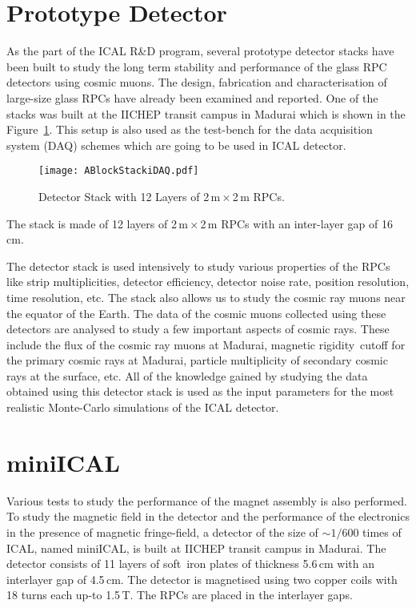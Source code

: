 \section{Prototype Detector}
As the part of the ICAL R\&D program, several prototype detector
stacks have been built to study the long term stability and
performance of the glass RPC detectors using cosmic muons. The design,
fabrication and characterisation of large-size glass RPCs have already
been examined and reported\cite{largerpc}. One of the stacks was built
at the IICHEP transit campus in Madurai which is shown in the
Figure~\ref{fig:ablock}. This setup is also used as the test-bench
for the data acquisition system (DAQ) schemes which are going to be
used in ICAL detector.
\begin{figure}[h]
  \centering
  \texttt{[image: ABlockStackiDAQ.pdf]}
  \caption{Detector Stack with 12 Layers of 2\,m\,$\times$\,2\,m RPCs.}
  \label{fig:ablock}
\end{figure}
The stack is made of 12 layers of 2\,m\,$\times$\,2\,m RPCs with an
inter-layer gap of 16\,cm.

The detector stack is used intensively to study various properties of
the RPCs like strip multiplicities, detector efficiency, detector
noise rate, position resolution, time resolution, etc. The stack also
allows us to study the cosmic ray muons near the equator of the Earth.
The data of the cosmic muons collected using these detectors are
analysed to study a few important aspects of cosmic rays. These
include the flux of the cosmic ray muons at Madurai\cite{pethu1},
magnetic rigidity~cutoff for the primary cosmic rays at Madurai,
particle multiplicity of secondary cosmic rays at the surface, etc.
All of the knowledge gained
by studying the data obtained using this detector stack is used as the
input parameters for the most realistic Monte-Carlo simulations of the
ICAL detector.

\section{miniICAL}
Various tests to study the performance of the magnet assembly is also
performed. To study the magnetic field in the detector and the
performance of the electronics in the presence of magnetic
fringe-field, a detector of the size of $\sim 1/600$ times of ICAL,
named miniICAL, is built at IICHEP transit campus in Madurai. The
detector consists of 11 layers of soft~iron plates of thickness
5.6\,cm with an interlayer gap of 4.5\,cm. The detector is magnetised
using two copper coils with 18 turns each up-to 1.5\,T. The RPCs are
placed in the interlayer gaps.

